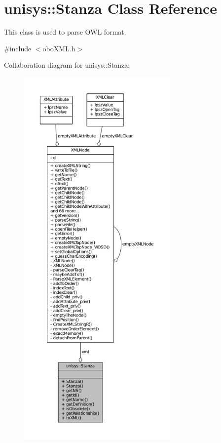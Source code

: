 \hypertarget{classunisys_1_1Stanza}{\section{unisys\-:\-:Stanza Class Reference}
\label{classunisys_1_1Stanza}
}


This class is used to parse O\-W\-L format.  




{\ttfamily \#include $<$obo\-X\-M\-L.\-h$>$}



Collaboration diagram for unisys\-:\-:Stanza\-:
\nopagebreak
\begin{figure}[H]
\begin{center}
\leavevmode
\includegraphics[height=550pt]{classunisys_1_1Stanza__coll__graph}
\end{center}
\end{figure}
